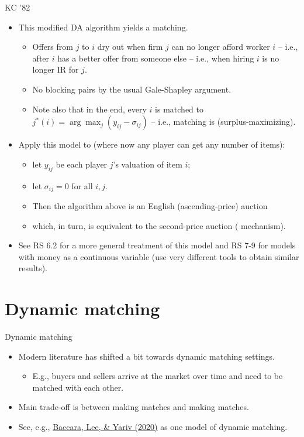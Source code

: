 \documentclass[english,10pt
,aspectratio=169
]{beamer}
\begin{document}
\begin{frame}{KC '82}
\begin{itemize}
	\item This modified DA algorithm yields a  matching.
	\begin{itemize}
		\item Offers from $j$ to $i$ dry out when firm $j$ can no longer afford worker $i$ -- i.e., after $i$ has a better offer from someone else -- i.e., when hiring $i$ is no longer IR for $j$.
		\item No blocking pairs by the usual Gale-Shapley argument.
		\item Note also that in the end, every $i$ is matched to $j^*(i) = \arg \max_j (y_{ij}-\sigma_{ij})$ -- i.e., matching is  (surplus-maximizing).
	\end{itemize}
	\pause
	\item Apply this model to  (where now any player can get any number of items): 
	\begin{itemize}
		\item let $y_{ij}$ be each player $j$'s valuation of item $i$;
		\item let $\sigma_{ij} = 0$ for all $i,j$.
		\item Then the algorithm above is an English (ascending-price) auction
		\item which, in turn, is equivalent to the second-price auction ( mechanism).
	\end{itemize}
	\item See RS 6.2 for a more general treatment of this model and RS 7-9 for models with money as a continuous variable (use very different tools to obtain similar results).
\end{itemize}
\end{frame}


\section{Dynamic matching}

\begin{frame}{Dynamic matching}
	\begin{itemize}
		\item Modern literature has shifted a bit towards dynamic matching settings.
		\begin{itemize}
			\item E.g., buyers and sellers arrive at the market over time and need to be matched with each other.
		\end{itemize}
		\item Main trade-off is between making  matches and making  matches.
		\item See, e.g., \href{https://econtheory.org/ojs/index.php/te/article/view/3740}{\uline{Baccara, Lee, \& Yariv (2020)}} as one model of dynamic matching.
	\end{itemize}
\end{frame}
\end{document}
